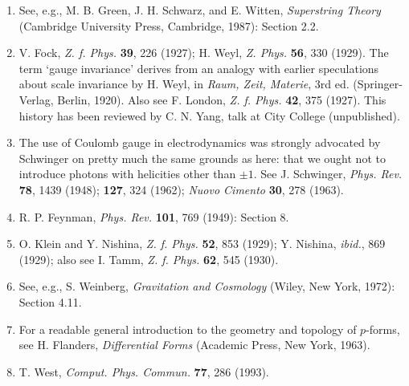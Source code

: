 \begin{enumerate}
\item[1.]\label{ref:8.1} See, e.g., M. B. Green, J. H. Schwarz, and E. Witten,
\emph{Superstring Theory} (Cambridge University Press, Cambridge, 1987):
Section 2.2.

\item[1a.]\label{ref:8.1a} V. Fock, \emph{Z. f. Phys.} \textbf{39}, 226 (1927); H. Weyl,
\emph{Z. Phys.} \textbf{56}, 330 (1929). The term `gauge invariance' derives
from an analogy with earlier speculations about scale invariance by H. Weyl,
in \emph{Raum, Zeit, Materie}, 3rd ed. (Springer-Verlag, Berlin, 1920). Also
see F. London, \emph{Z. f. Phys.} \textbf{42}, 375 (1927). This history has
been reviewed by C. N. Yang, talk at City College (unpublished).

\item[2.]\label{ref:8.2} The use of Coulomb gauge in electrodynamics was strongly advocated
by Schwinger on pretty much the same grounds as here: that we ought not to
introduce photons with helicities other than $\pm1$. See J. Schwinger,
\emph{Phys. Rev.} \textbf{78}, 1439 (1948); \textbf{127}, 324 (1962);
\emph{Nuovo Cimento} \textbf{30}, 278 (1963).

\item[3.]\label{ref:8.3} R. P. Feynman, \emph{Phys. Rev.} \textbf{101}, 769 (1949):
Section 8.

\item[4.]\label{ref:8.4} O. Klein and Y. Nishina, \emph{Z. f. Phys.} \textbf{52}, 853
(1929); Y. Nishina, \emph{ibid.}, 869 (1929); also see I. Tamm,
\emph{Z. f. Phys.} \textbf{62}, 545 (1930).

\item[5.]\label{ref:8.5} See, e.g., S. Weinberg, \emph{Gravitation and Cosmology} (Wiley,
New York, 1972): Section 4.11.

\item[6.]\label{ref:8.6} For a readable general introduction to the geometry and topology
of $p$-forms, see H. Flanders, \emph{Differential Forms} (Academic Press,
New York, 1963).

\item[7.]\label{ref:8.7} T. West, \emph{Comput. Phys. Commun.} \textbf{77}, 286 (1993).
\end{enumerate}
